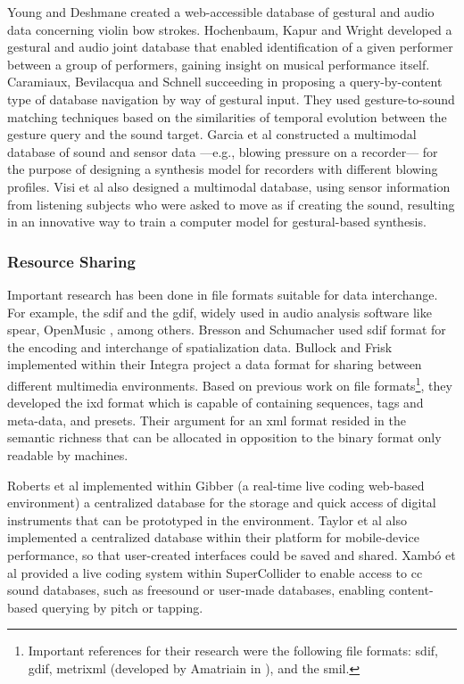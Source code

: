 Young and Deshmane \parencite{Young2007} created a web-accessible database of gestural and audio data concerning violin bow strokes. Hochenbaum, Kapur and Wright \parencite{Hochenbaum2010} developed a gestural and audio joint database that enabled identification of a given performer between a group of performers, gaining insight on musical performance itself. Caramiaux, Bevilacqua and Schnell \parencite{Caramiaux2011} succeeding in proposing a query-by-content type of database navigation by way of gestural input. They used gesture-to-sound matching techniques based on the similarities of temporal evolution between the gesture query and the sound target. Garcia et al \parencite{Garcia2011} constructed a multimodal database of sound and sensor data ---e.g., blowing pressure on a recorder--- for the purpose of designing a synthesis model for recorders with different blowing profiles. Visi et al \parencite{fvisi:2017} also designed a multimodal database, using sensor information from listening subjects who were asked to move as if creating the sound, resulting in an innovative way to train a computer model for gestural-based synthesis.



\subsubsection{Resource Sharing}
\label{application:sharing}

Important research has been done in file formats suitable for data interchange. For example, the \gls{sdif} and the \gls{gdif}, widely used in audio analysis software like \gls{spear}, OpenMusic \parencite{icmc/bbp2372.2004.004}, among others. Bresson and Schumacher \parencite{icmc/bbp2372.2004.004} used \gls{sdif} format for the encoding and interchange of spatialization data. Bullock and Frisk \parencite{icmc/bbp2372.2009.012} implemented within their Integra project a data format for sharing between different multimedia environments. Based on previous work on file formats\footnote{Important references for their research were the following file formats: \gls{sdif}, \gls{gdif}, \gls{metrixml} (developed by Amatriain in \parencite{Amatriain/2004/phdthesis}), and the \gls{smil}.}, they developed the \gls{ixd} format which is capable of containing sequences, tags and meta-data, and presets. Their argument for an \gls{xml} format resided in the semantic richness that can be allocated in opposition to the binary format only readable by machines. 

Roberts et al \parencite{croberts:2014} implemented within Gibber (a real-time live coding web-based environment) a centralized database for the storage and quick access of digital instruments that can be prototyped in the environment. Taylor et al \parencite{btaylor:2014} also implemented a centralized database within their platform for mobile-device performance, so that user-created interfaces could be saved and shared. Xambó et al \parencite{nime18-Xambo-b} provided a live coding system within SuperCollider to enable access to \gls{cc} sound databases, such as \gls{freesound} or user-made databases, enabling content-based querying by pitch or tapping.




